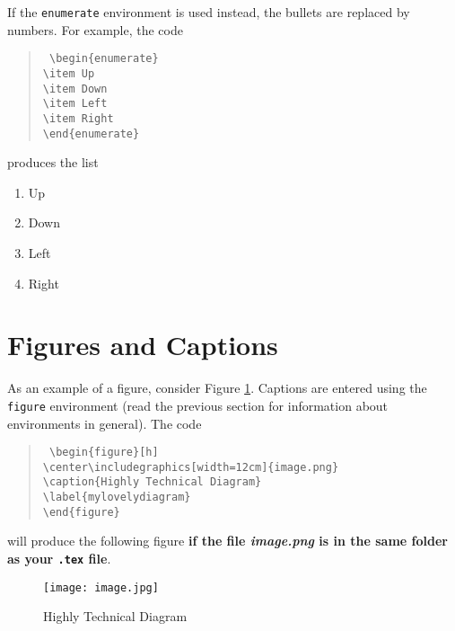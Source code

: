 If the \texttt{enumerate} environment is used instead, the bullets are replaced 
by numbers. For example, the code
\begin{quote}\tt
	\textbackslash{}begin\{enumerate\} \\[-0.5em]
	\hspace*{2em}\textbackslash{}item Up \\[-0.5em]
	\hspace*{2em}\textbackslash{}item Down \\[-0.5em]
	\hspace*{2em}\textbackslash{}item Left \\[-0.5em]
	\hspace*{2em}\textbackslash{}item Right \\[-0.5em]
	\textbackslash{}end\{enumerate\}
\end{quote}
produces the list
\begin{enumerate} \item Up \item Down \item Left \item Right \end{enumerate}

\section{Figures and Captions}
As an example of a figure, consider Figure \ref{fig:mylovelydiagram}. Captions are 
entered using the \texttt{figure} environment (read the previous section for 
information about environments in general). The code
\begin{quote}\tt
	\textbackslash{}begin\{figure\}[h] \\[-0.5em]
	\hspace*{2em}\textbackslash{}center\textbackslash{}includegraphics[width=12cm]\{image.png\}
	 \\[-0.5em]
	\hspace*{2em}\textbackslash{}caption\{Highly Technical Diagram\} \\[-0.5em]
	\hspace*{2em}\textbackslash{}label\{mylovelydiagram\} \\[-0.5em]
	\textbackslash{}end\{figure\}
\end{quote}
will produce the following figure \textbf{if the file \textit{image.png} is in 
the same folder as your \texttt{.tex} file}.

\begin{figure}[tb]
	\center\texttt{[image: image.jpg]}
	\caption{Highly Technical Diagram}
	\label{fig:mylovelydiagram}
\end{figure}


